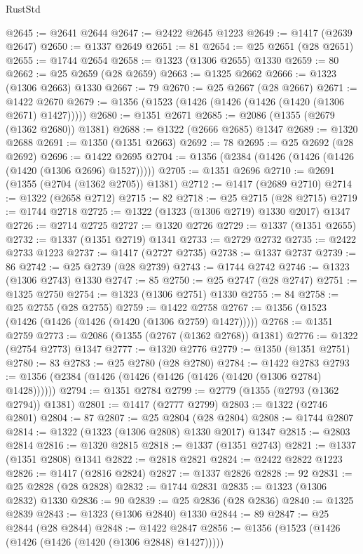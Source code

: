 \begin{lexlean}{RustStd}
\begin{coremodule}
{\begin{coremodule}
{{{{{{{{{{{{{{{{{{{{{{{{{{{{{{{{{{@2645 := @2641 @2644
@2647 := @2422 @2645 @1223
@2649 := @1417 (@2639 @2647)
@2650 := @1337 @2649
@2651 := 81
@2654 := @25 @2651 (@28 @2651)
@2655 := @1744 @2654
@2658 := @1323 (@1306 @2655) @1330
@2659 := 80
@2662 := @25 @2659 (@28 @2659)
@2663 := @1325 @2662
@2666 := @1323 (@1306 @2663) @1330
@2667 := 79
@2670 := @25 @2667 (@28 @2667)
@2671 := @1422 @2670
@2679 := @1356 (@1523 (@1426 (@1426 (@1426 (@1420 (@1306 @2671) @1427)))))
@2680 := @1351 @2671
@2685 := @2086 (@1355 (@2679 (@1362 @2680)) @1381)
@2688 := @1322 (@2666 @2685) @1347
@2689 := @1320 @2688
@2691 := @1350 (@1351 @2663)
@2692 := 78
@2695 := @25 @2692 (@28 @2692)
@2696 := @1422 @2695
@2704 := @1356 (@2384 (@1426 (@1426 (@1426 (@1420 (@1306 @2696) @1527)))))
@2705 := @1351 @2696
@2710 := @2691 (@1355 (@2704 (@1362 @2705)) @1381)
@2712 := @1417 (@2689 @2710)
@2714 := @1322 (@2658 @2712)
@2715 := 82
@2718 := @25 @2715 (@28 @2715)
@2719 := @1744 @2718
@2725 := @1322 (@1323 (@1306 @2719) @1330 @2017) @1347
@2726 := @2714 @2725
@2727 := @1320 @2726
@2729 := @1337 (@1351 @2655)
@2732 := @1337 (@1351 @2719) @1341
@2733 := @2729 @2732
@2735 := @2422 @2733 @1223
@2737 := @1417 (@2727 @2735)
@2738 := @1337 @2737
@2739 := 86
@2742 := @25 @2739 (@28 @2739)
@2743 := @1744 @2742
@2746 := @1323 (@1306 @2743) @1330
@2747 := 85
@2750 := @25 @2747 (@28 @2747)
@2751 := @1325 @2750
@2754 := @1323 (@1306 @2751) @1330
@2755 := 84
@2758 := @25 @2755 (@28 @2755)
@2759 := @1422 @2758
@2767 := @1356 (@1523 (@1426 (@1426 (@1426 (@1420 (@1306 @2759) @1427)))))
@2768 := @1351 @2759
@2773 := @2086 (@1355 (@2767 (@1362 @2768)) @1381)
@2776 := @1322 (@2754 @2773) @1347
@2777 := @1320 @2776
@2779 := @1350 (@1351 @2751)
@2780 := 83
@2783 := @25 @2780 (@28 @2780)
@2784 := @1422 @2783
@2793 := @1356 (@2384 (@1426 (@1426 (@1426 (@1426 (@1420 (@1306 @2784) @1428))))))
@2794 := @1351 @2784
@2799 := @2779 (@1355 (@2793 (@1362 @2794)) @1381)
@2801 := @1417 (@2777 @2799)
@2803 := @1322 (@2746 @2801)
@2804 := 87
@2807 := @25 @2804 (@28 @2804)
@2808 := @1744 @2807
@2814 := @1322 (@1323 (@1306 @2808) @1330 @2017) @1347
@2815 := @2803 @2814
@2816 := @1320 @2815
@2818 := @1337 (@1351 @2743)
@2821 := @1337 (@1351 @2808) @1341
@2822 := @2818 @2821
@2824 := @2422 @2822 @1223
@2826 := @1417 (@2816 @2824)
@2827 := @1337 @2826
@2828 := 92
@2831 := @25 @2828 (@28 @2828)
@2832 := @1744 @2831
@2835 := @1323 (@1306 @2832) @1330
@2836 := 90
@2839 := @25 @2836 (@28 @2836)
@2840 := @1325 @2839
@2843 := @1323 (@1306 @2840) @1330
@2844 := 89
@2847 := @25 @2844 (@28 @2844)
@2848 := @1422 @2847
@2856 := @1356 (@1523 (@1426 (@1426 (@1426 (@1420 (@1306 @2848) @1427)))))
}}}}}}}}}}}}}}}}}}}}}}}}}}}}}}}}}}
\end{coremodule}}
\end{coremodule}
\end{lexlean}
